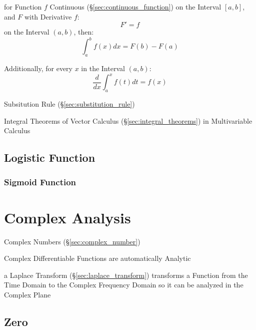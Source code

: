 for Function $f$ Continuous (\S\ref{sec:continuous_function}) on the Interval
$[a,b]$, and $F$ with Derivative $f$:
\[
  F' = f
\]
on the Interval $(a,b)$, then:
\[
  \int_a^b f(x) dx = F(b) - F(a)
\]

Additionally, for every $x$ in the Interval $(a,b)$:
\[
  \frac{d}{dx}\int^x_a f(t) dt = f(x)
\]

\fist Subsitution Rule (\S\ref{sec:substitution_rule})

\fist Integral Theorems of Vector Calculus
(\S\ref{sec:integral_theorems}) in Multivariable Calculus



\subsection{Logistic Function}\label{sec:logistic_function}


\subsubsection{Sigmoid Function}\label{sec:sigmoid_function}



\section{Complex Analysis}\label{sec:complex_analysis}

Complex Numbers (\S\ref{sec:complex_number})

Complex Differentiable Functions are automatically Analytic %

a Laplace Transform (\S\ref{sec:laplace_transform}) transforms a Function from
the Time Domain to the Complex Frequency Domain so it can be analyzed in the
Complex Plane



\subsection{Zero}\label{sec:complex_zero}

